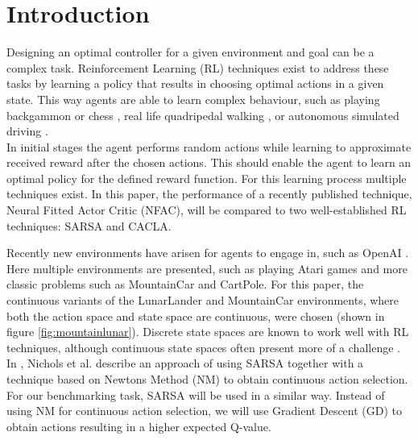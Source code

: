 
\section{Introduction}

Designing an optimal controller for a given environment and goal can be a complex task. Reinforcement Learning (RL) techniques exist to address these tasks by learning a policy that results in choosing optimal actions in a given state. This way agents are able to learn complex behaviour, such as playing backgammon \cite{tesauro2002programming} or chess \cite{baxter1999knightcap},
real life quadripedal walking \cite{kohl2004policy}, or autonomous simulated driving \cite{}. \\  %


In initial stages the agent performs random actions while learning to approximate received reward after the chosen actions. This should enable the agent to learn an optimal policy for the defined reward function. For this learning process multiple techniques exist. In this paper, the performance of a recently published technique, Neural Fitted Actor Critic (NFAC), will be compared to two well-established RL techniques: SARSA and CACLA.   

Recently new environments have arisen for agents to engage in, such as OpenAI \cite{openaigym}. Here multiple environments are presented, such as playing Atari games and more classic problems such as MountainCar and CartPole. For this paper, the continuous variants of the LunarLander and MountainCar environments, where both the action space and state space are continuous, were chosen (shown in figure \ref{fig:mountainlunar}). Discrete state spaces are known to work well with RL techniques, although continuous state spaces often present more of a challenge \cite{cetina2008multilayer}. \\

In \cite{nichols2015continuous}, Nichols et al. describe an approach of using SARSA together with a technique based on Newtons Method (NM) to obtain continuous action selection. For our benchmarking task, SARSA will be used in a similar way. Instead of using NM for continuous action selection, we will use Gradient Descent (GD) to obtain actions resulting in a higher expected Q-value.

